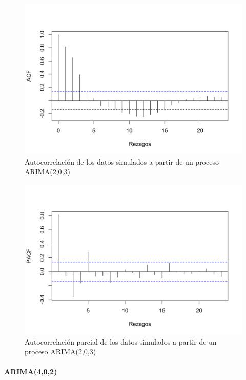 \documentclass[
]{article}
\begin{document}
\begin{figure}[H]
\includegraphics[width=1\linewidth,height=1\textheight]{Tesis_files/figure-latex/arima203_acf-1} \caption{Autocorrelación de los datos simulados a partir de un proceso ARIMA(2,0,3)}\label{fig:arima203_acf}
\end{figure}

\begin{figure}[H]
\includegraphics[width=1\linewidth,height=1\textheight]{Tesis_files/figure-latex/arima203_pacf-1} \caption{Autocorrelación parcial de los datos simulados a partir de un proceso ARIMA(2,0,3)}\label{fig:arima203_pacf}
\end{figure}

\paragraph{ARIMA(4,0,2)}
\end{document}
